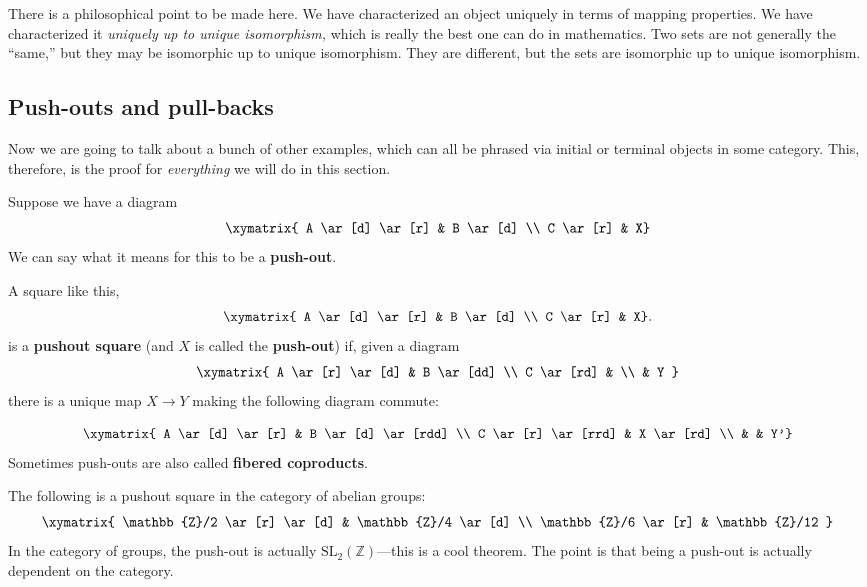 There is a philosophical point to be made here. We have characterized an object
uniquely in terms of mapping properties. We have characterized it
\emph{uniquely up to unique isomorphism,} which is really the best one can do
in mathematics. Two sets are not generally the ``same,'' but they may be
isomorphic up to unique isomorphism. They are different,
but the sets are isomorphic up
to unique isomorphism.

\subsection{Push-outs and pull-backs}

Now we are going to talk about a bunch of other examples, which can all be
phrased via initial or terminal objects in some category. This,
therefore, is the proof for \emph{everything} we will do in this section.

Suppose we have a diagram
\[
\xymatrix{
A \ar[d] \ar[r] &  B \ar[d] \\
C \ar[r] &  X}
\]
We can say what it means for this to be a \textbf{push-out}.

\begin{definition}
A square like this,
\[
\xymatrix{
A \ar[d] \ar[r] &  B \ar[d] \\
C \ar[r] &  X}.
\]
is a \textbf{pushout square} (and $X$ is called the \textbf{push-out}) if,
given a diagram
\[ \xymatrix{
A \ar[r] \ar[d]  &  B \ar[dd] \\
C \ar[rd] & \\
& Y
}\]
there is a unique map $X \to Y$ making the following diagram commute:

\[
\xymatrix{
A \ar[d] \ar[r] &  B \ar[d] \ar[rdd] \\
C \ar[r] \ar[rrd] &  X \ar[rd] \\
& & Y'}
\]
Sometimes push-outs are also called \textbf{fibered coproducts}.
\end{definition}

\begin{example}
The following is a pushout square in the category of abelian groups:
\[ \xymatrix{
\mathbb{Z}/2 \ar[r] \ar[d]  &  \mathbb{Z}/4 \ar[d]  \\
\mathbb{Z}/6 \ar[r] &  \mathbb{Z}/12
}\]
In the category of groups, the push-out is actually
$\mathrm{SL}_2(\mathbb{Z})$---this is a cool theorem. The point is that being a
push-out is actually dependent on the category.
\end{example}

